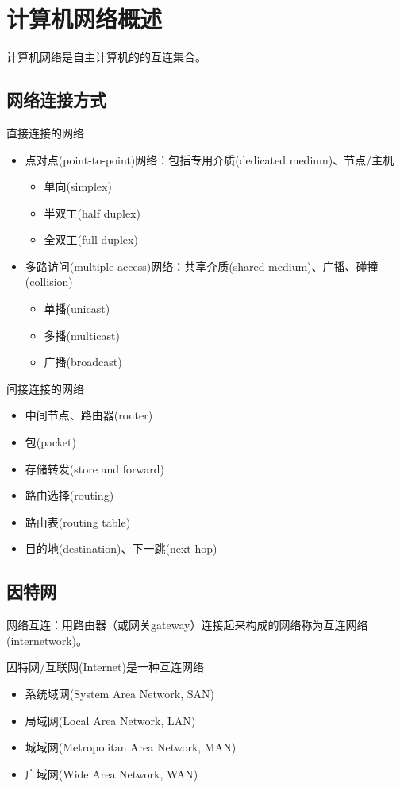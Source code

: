 
\section{计算机网络概述}
计算机网络是自主计算机的的互连集合。

\subsection{网络连接方式}
直接连接的网络
\begin{itemize}
\item 点对点(point-to-point)网络：包括专用介质(dedicated medium)、节点/主机
\begin{itemize}
	\item 单向(simplex)
	\item 半双工(half duplex)
	\item 全双工(full duplex)
\end{itemize}
\item 多路访问(multiple access)网络：共享介质(shared medium)、广播、碰撞(collision)
\begin{itemize}
	\item 单播(unicast)
	\item 多播(multicast)
	\item 广播(broadcast)
\end{itemize}
\end{itemize}

间接连接的网络
\begin{itemize}
	\item 中间节点、路由器(router)
	\item 包(packet)
	\item 存储转发(store and forward)
	\item 路由选择(routing)
	\item 路由表(routing table)
	\item 目的地(destination)、下一跳(next hop)
\end{itemize}

\subsection{因特网}
网络互连：用路由器（或网关gateway）连接起来构成的网络称为互连网络(internetwork)。

因特网/互联网(Internet)是一种互连网络
\begin{itemize}
	\item 系统域网(System Area Network, SAN)
	\item 局域网(Local Area Network, LAN)
	\item 城域网(Metropolitan Area Network, MAN)
	\item 广域网(Wide Area Network, WAN)
\end{itemize}

